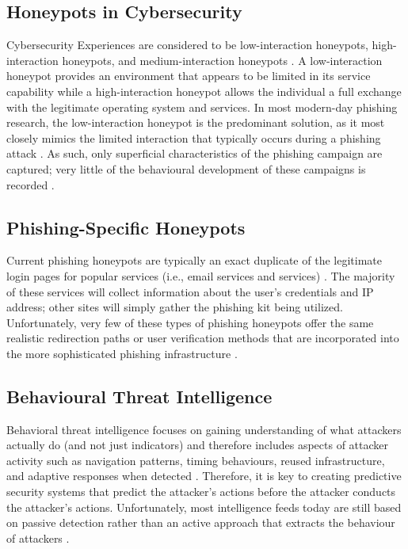 \subsection{Honeypots in Cybersecurity}

Cybersecurity Experiences are considered to be low-interaction honeypots, high-interaction honeypots, and medium-interaction honeypots \cite{Seifert2006Taxonomy}. A low-interaction honeypot provides an environment that appears to be limited in its service capability while a high-interaction honeypot allows the individual a full exchange with the legitimate operating system and services. In most modern-day phishing research, the low-interaction honeypot is the predominant solution, as it most closely mimics the limited interaction that typically occurs during a phishing attack \cite{Artail2006Distributed}. As such, only superficial characteristics of the phishing campaign are captured; very little of the behavioural development of these campaigns is recorded \cite{Holz2006AttackPatterns}.

\subsection{Phishing-Specific Honeypots}

Current phishing honeypots are typically an exact duplicate of the legitimate login pages for popular services (i.e., email services and services) \cite{Provos2004ClientHoneypots}. The majority of these services will collect information about the user’s credentials and IP address; other sites will simply gather the phishing kit being utilized. Unfortunately, very few of these types of phishing honeypots offer the same realistic redirection paths or user verification methods that are incorporated into the more sophisticated phishing infrastructure \cite{Leita2008Phishing}.

\subsection{Behavioural Threat Intelligence}

Behavioral threat intelligence focuses on gaining understanding of what attackers actually do (and not just indicators) and therefore includes aspects of attacker activity such as navigation patterns, timing behaviours, reused infrastructure, and adaptive responses when detected \cite{Song2005HoneyStat,Holz2006AttackPatterns}. Therefore, it is key to creating predictive security systems that predict the attacker's actions before the attacker conducts the attacker's actions. Unfortunately, most intelligence feeds today are still based on passive detection rather than an active approach that extracts the behaviour of attackers \cite{Bringer2012HoneypotSurvey}.

